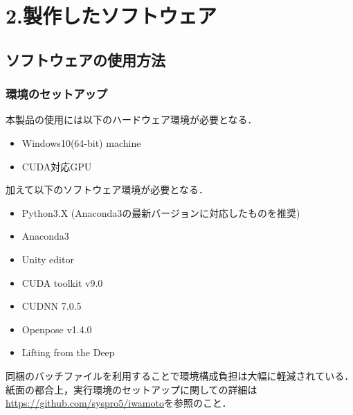 
\usepackage{url}
\usepackage{textcomp}





\section{2.製作したソフトウェア}
\subsection{ソフトウェアの使用方法}
\subsubsection{環境のセットアップ}
本製品の使用には以下のハードウェア環境が必要となる．
\begin{itemize}
  \item Windows10(64-bit) machine
  \item CUDA対応GPU
\end{itemize}

加えて以下のソフトウェア環境が必要となる．
\begin{itemize}
  \item Python3.X (Anaconda3の最新バージョンに対応したものを推奨)
  \item Anaconda3
  \item Unity editor
  \item CUDA toolkit v9.0
  \item CUDNN 7.0.5
  \item Openpose v1.4.0
  \item Lifting from the Deep
\end{itemize}

同梱のバッチファイルを利用することで環境構成負担は大幅に軽減されている．紙面の都合上，実行環境のセットアップに関しての詳細は\url{https://github.com/syspro5/iwamoto}を参照のこと．


